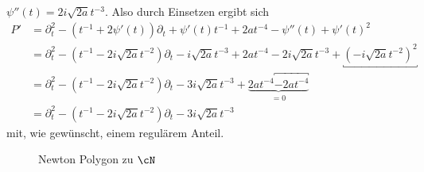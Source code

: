 $\psi''(t)=2i\sqrt{2a}t^{-3}$. Also durch Einsetzen ergibt sich
\begin{align*}
P' &= \partial_t^2 - (t^{-1} + 2\psi'(t))\partial_t
    + \psi'(t)t^{-1} + 2at^{-4} -\psi''(t)
    + \psi'(t)^2
\\&= \partial_t^2 - (t^{-1} - 2i\sqrt{2a}t^{-2})\partial_t - i\sqrt{2a}t^{-3}
    + 2at^{-4} - 2i\sqrt{2a}t^{-3} + \underbracket{(-i\sqrt{2a}t^{-2})^2}
\\&= \partial_t^2 - (t^{-1} - 2i\sqrt{2a}t^{-2})\partial_t - 3i\sqrt{2a}t^{-3}
  + \underset{=0}{\underbrace{ 2at^{-4} \overbracket{- 2at^{-4}}}}
\\&= \partial_t^2 - (t^{-1} - 2i\sqrt{2a}t^{-2})\partial_t - 3 i\sqrt{2a}t^{-3}
\end{align*}
mit, wie gewünscht, einem regulärem Anteil.
\begin{figure}[H]
\begin{center}
\end{center}
\caption{Newton Polygon zu $\cN$}
\end{figure}
\begin{comment}
\begin{bem}
Alternativ ließe sich ein Minimalpolynom von $\cN$ mit der Formel aus Lemma
\ref{lem:twistRechenregel} berechnen. Denn mit
$\rho^*P(t,\partial_t)=t^4\partial_t^2-t^3\partial_t+2a$, ist
\begin{align*}
\rho^*P(t,\partial_t-\frac{\partial \psi}{\partial t})
&=\rho^*P(t,\partial_t-\frac{-i\sqrt{2a}}{t^2})
\\&= t^4\underbracket{(\partial_t+\frac{i\sqrt{2a}}{t^2})^2}
    \underbracket{- t^3(\partial_t+\frac{i\sqrt{2a}}{t^2})} + 2a
\\&= t^4 \overbracket{\underbracket{
      (\partial_t+i\sqrt{2a}t^{-2})(\partial_t+i\sqrt{2a}t^{-2})
    }} \overbracket{ - t^3\partial_t - i\sqrt{2a}t} + 2a
\\&= t^4 \overbracket{ (\partial_t^2 + i\sqrt{2a}t^{-2}\partial_t
      +\partial_ti\sqrt{2a}t^{-2} + \underbracket{(i\sqrt{2a}t^{-2})^2)}
    } - t^3\partial_t - i\sqrt{2a}t + 2a
\\&= t^4\partial_t^2 + i\sqrt{2a}t^{2}\partial_t
    + i\sqrt{2a}t^4\underbracket{\partial_tt^{-2}} \overbracket{-2at^{-4}}t^4
    - t^3\partial_t
    - i\sqrt{2a}t + 2a
\\&= t^4\partial_t^2 + i\sqrt{2a}t^{2}\partial_t
    + i\sqrt{2a}t^4\overbracket{(t^{-2}\partial_t-2t^{-3})} - t^3\partial_t
    - i\sqrt{2a}t
\\&= t^4\partial_t^2 + i\sqrt{2a}t^{2}\partial_t + i\sqrt{2a}t^2\partial_t
    - 2i\sqrt{2a}t - t^3\partial_t - i\sqrt{2a}t
\\&= t^4\partial_t^2 - (t^3-2i\sqrt{2a}t^{2})\partial_t - 3i\sqrt{2a}t
\\&= t^4P'(t,\partial_t)
\end{align*}
\end{bem}
\end{comment}

